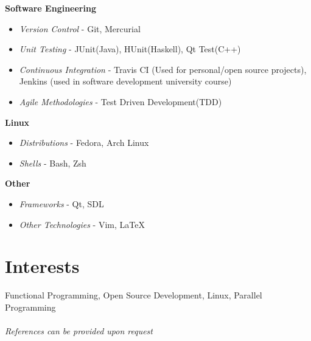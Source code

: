 \documentclass[10pt]{article} %
\begin{document}
\bf{Software Engineering}
\begin{itemize}
\item \textit{Version Control} - Git, Mercurial
\item \textit{Unit Testing} - JUnit(Java), HUnit(Haskell), Qt Test(C++)
\item \textit{Continuous Integration} - Travis CI (Used for personal/open source projects),  Jenkins (used in software development university course)
\item \textit{Agile Methodologies} - Test Driven Development(TDD)
\end{itemize}

\bf{Linux}
\begin{itemize}
\item \textit{Distributions} - Fedora, Arch Linux 
\item \textit{Shells} - Bash, Zsh
\end{itemize}

\bf{Other}
\begin{itemize}
\item \textit{Frameworks} - Qt, SDL
\item \textit{Other Technologies} - Vim, \LaTeX
\end{itemize}


\section{Interests}
Functional Programming, Open Source Development, Linux, Parallel Programming\\\\




\textit{References can be provided upon request}

\end{document}
